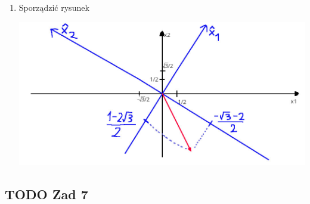 \documentclass[11pt]{article}
\begin{document}
\begin{enumerate}
\item Sporządzić rysunek
\label{sec:orgdfe831e}
\begin{center}
\includegraphics[width=.9\linewidth]{img/zad6.jpg}
\end{center}
\end{enumerate}
\subsection{{\bfseries\sffamily TODO} Zad 7}
\label{sec:orga75d0c9}
\end{document}

